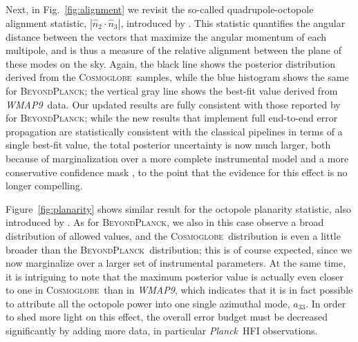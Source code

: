 \documentclass[twocolumn]{../../common/aa}
\def\WMAPnine{\emph{WMAP9}}
\def\Planck{\emph{Planck}}
\newcommand{\bp}{\textsc{BeyondPlanck}}
\newcommand{\cosmoglobe}{\textsc{Cosmoglobe}}
\begin{document}
Next, in Fig.~\ref{fig:alignment} we revisit the so-called quadrupole-octopole alignment statistic, $|\hat{n}_2\cdot \hat{n}_3|$, introduced by \citet{deOliveira-Costa2004}. This statistic quantifies the angular distance between the vectors that maximize the angular momentum of each multipole, and is thus a measure of the relative alignment between the plane of these modes on the sky. Again, the black line shows the posterior distribution derived from the \cosmoglobe\ samples, while the blue histogram shows the same for \bp; the vertical gray line shows the best-fit value derived from \WMAPnine\ data. Our updated results are fully consistent with those reported by \citet{bp11} for \bp; while the new results that implement full end-to-end error propagation are statistically consistent with the classical pipelines in terms of a single best-fit value, the total posterior uncertainty is now much larger, both because of marginalization over a more complete instrumental model and a more conservative confidence mask \citep{bp11}, to the point that the evidence for this effect is no longer compelling. 

Figure~\ref{fig:planarity} shows similar result for the octopole planarity statistic, also introduced by \citet{deOliveira-Costa2004}. As for \bp, we also in this case observe a broad distribution of allowed values, and the \cosmoglobe\ distribution is even a little broader than the \bp\ distribution; this is of course expected, since we now marginalize over a larger set of instrumental parameters. At the same time, it is intriguing to note that the maximum posterior value is actually even closer to one in \cosmoglobe\ than in \WMAPnine, which indicates that it is in fact possible to attribute all the octopole power into one single azimuthal mode, $a_{33}$. In order to shed more light on this effect, the overall error budget must be decreased significantly by adding more data, in particular \Planck\ HFI observations. 
\end{document}
